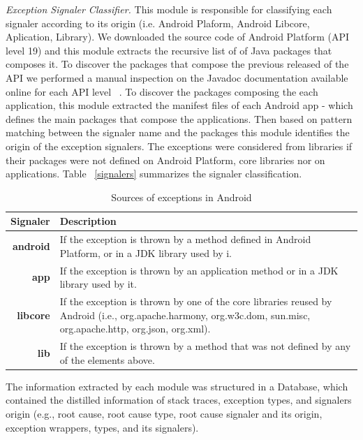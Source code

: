 \documentclass[conference]{IEEEtran}
\begin{document}
\noindent\emph{Exception Signaler Classifier.} 
This module is responsible for classifying each signaler according 
to its origin (i.e. Android Plaform, Android Libcore, Aplication, Library). 
We downloaded the source code of Android Platform (API level 19)
and this module extracts the recursive list of 
of Java packages that composes it. To discover the packages that compose 
the previous released of the API we performed a manual inspection on the Javadoc
documentation available online for each API level ~\cite{apidocs}.
To discover the packages composing the each application, this module 
extracted the manifest files of each Android app
 - which defines the main packages that compose the applications.
Then based on pattern matching between the signaler name and the packages 
 this module identifies the origin of the exception signalers.
The exceptions were considered from libraries if their packages were not defined 
on Android Platform, core libraries nor on applications.
Table ~\ref{signalers} summarizes the signaler classification.

\begin{table}
  \centering
  \begin{tabular}{rp{29em}}
    \hline
    \bfseries{Signaler} & \bfseries{Description} \\
    \hline
    \bfseries{android} & If the exception is thrown by a method defined in Android Platform, or in a JDK library used by i.\\
    \bfseries{app}     & If the exception is thrown by an application method or in a JDK library used by it.\\
    \bfseries{libcore} & If the exception is thrown by one of the core libraries reused by Android (i.e., org.apache.harmony, org.w3c.dom, sun.misc, org.apache.http, org.json, org.xml). \\
    \bfseries{lib}     & If the exception is thrown by a method that was not defined by any of the elements above.\\
    \hline
  \end{tabular}
  \caption{Sources of exceptions in Android}
  \label{tab:signalers}
\end{table}

The information extracted by each module was structured in a Database,
which contained the distilled information of stack traces, exception types,
and signalers origin (e.g., root cause, root cause type, root cause signaler and its origin,
exception wrappers,  types, and its signalers).
\end{document}
